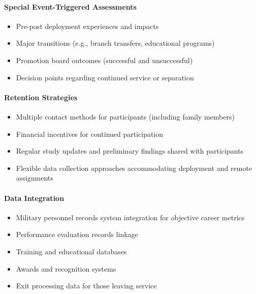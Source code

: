 \documentclass[./main.tex]{subfiles}
\begin{document}
\paragraph{Special Event-Triggered
Assessments}\label{special-event-triggered-assessments}

\begin{itemize}
\tightlist
\item
  Pre-post deployment experiences and impacts
\item
  Major transitions (e.g., branch transfers, educational programs)
\item
  Promotion board outcomes (successful and unsuccessful)
\item
  Decision points regarding continued service or separation
\end{itemize}

\paragraph{Retention Strategies}\label{retention-strategies}

\begin{itemize}
\tightlist
\item
  Multiple contact methods for participants (including family members)
\item
  Financial incentives for continued participation
\item
  Regular study updates and preliminary findings shared with
  participants
\item
  Flexible data collection approaches accommodating deployment and
  remote assignments
\end{itemize}

\paragraph{Data Integration}\label{data-integration}

\begin{itemize}
\tightlist
\item
  Military personnel records system integration for objective career
  metrics
\item
  Performance evaluation records linkage
\item
  Training and educational databases
\item
  Awards and recognition systems
\item
  Exit processing data for those leaving service
\end{itemize}
\end{document}
